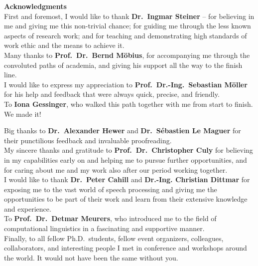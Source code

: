 \begin{center}
    {\calligra \fontsize{40}{50}\selectfont \textbf{Acknowledgments}}\\[1.7cm]
    \Large
	First and foremost, I would like to thank \textbf{Dr.\ Ingmar Steiner} -- for believing in me and giving me this non-trivial chance; for guiding me through the less known aspects of research work; and for teaching and demonstrating high standards of work ethic and the means to achieve it.\\[0.8cm]
	
	Many thanks to \textbf{ Prof.\ Dr.\ Bernd Möbius}, for accompanying me through the convoluted paths of academia, and giving his support all the way to the finish line.\\[0.8cm]
	
	I would like to express my appreciation to \textbf{Prof.\ Dr.-Ing.\ Sebastian Möller} for his help and feedback that were always quick, precise, and friendly.\\[0.8cm]
	
	To \textbf{Iona Gessinger}, who walked this path together with me from start to finish.
	We made it!\\[2cm]
	
	\vspace*{2cm}
	
	Big thanks to \textbf{Dr.\ Alexander Hewer} and \textbf{Dr.\ Sébastien Le Maguer} for their punctilious feedback and invaluable proofreading.\\[0.8cm]
	
	My sincere thanks and gratitude to \textbf{Prof.\ Dr.\ Christopher Culy} for believing in my capabilities early on and helping me to pursue further opportunities, and for caring about me and my work also after our period working together.\\[0.8cm]
	
	I would like to thank \textbf{Dr.\ Peter Cahill} and \textbf{Dr.-Ing. Christian Dittmar} for exposing me to the vast world of speech processing and giving me the opportunities to be part of their work and learn from their extensive knowledge and experience.\\[0.8cm]
	
	To \textbf{Prof.\ Dr.\ Detmar Meurers}, who introduced me to the field of computational linguistics in a fascinating and supportive manner.\\[0.8cm]
	
	Finally, to all fellow Ph.D.\ students, fellow event organizers, colleagues, collaborators, and interesting people I met in conference and workshops around the world.
	It would not have been the same without you.\\[0.8cm]
\end{center}
\newpage

